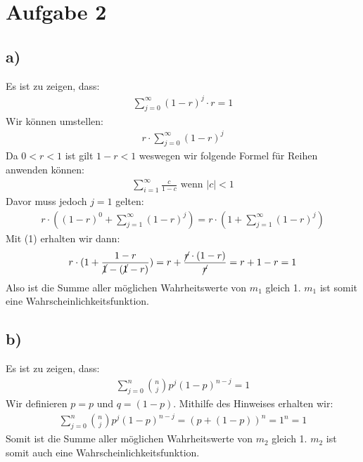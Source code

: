 \pagebreak
\section*{Aufgabe 2}
\subsection*{a)}
Es ist zu zeigen, dass:
\begin{align*}
  \sum_{j=0}^{\infty}(1-r)^j\cdot r = 1
\end{align*}
Wir können umstellen:
\begin{align*}
r\cdot \sum_{j=0}^{\infty}(1-r)^j
\end{align*}
Da $0<r<1$ ist gilt $ 1-r < 1 $ weswegen wir folgende Formel für Reihen anwenden können:
\begin{align}
  \sum_{i=1}^{\infty}\frac{ c }{ 1-c } \text{ wenn }|c| < 1
\end{align}
Davor muss jedoch $ j=1 $ gelten:
\begin{align*}
  r\cdot ((1-r)^0 + \sum_{j=1}^{\infty}(1-r)^j) = r\cdot (1+ \sum_{j=1}^{\infty}(1-r)^j) 
\end{align*}
Mit (1) erhalten wir dann:
\begin{align*}
  r\cdot (1 + \frac{ 1-r }{ \cancel{1}-(\cancel{1}-r) } ) = r + \frac{ \cancel{r}\cdot(1-r) }{ \cancel{r} } = r+1-r = 1
\end{align*}
Also ist die Summe aller möglichen Wahrheitswerte von $ m_1 $ gleich 1. $ m_1 $ ist somit eine Wahrscheinlichkeitsfunktion.
\subsection*{b)}
Es ist zu zeigen, dass:
\begin{align*}
  \sum_{j=0}^{n}\binom{n}{j}p^j(1-p)^{n-j} = 1
\end{align*}
Wir definieren $ p=p $ und $ q=(1-p) $. Mithilfe des Hinweises erhalten wir:
\begin{align*}
  \sum_{j=0}^{n}\binom{n}{j}p^j(1-p)^{n-j} = (p+(1-p))^n = 1^n = 1
\end{align*}
Somit ist die Summe aller möglichen Wahrheitswerte von $ m_2 $ gleich 1. $ m_2 $ ist somit auch eine Wahrscheinlichkeitsfunktion.